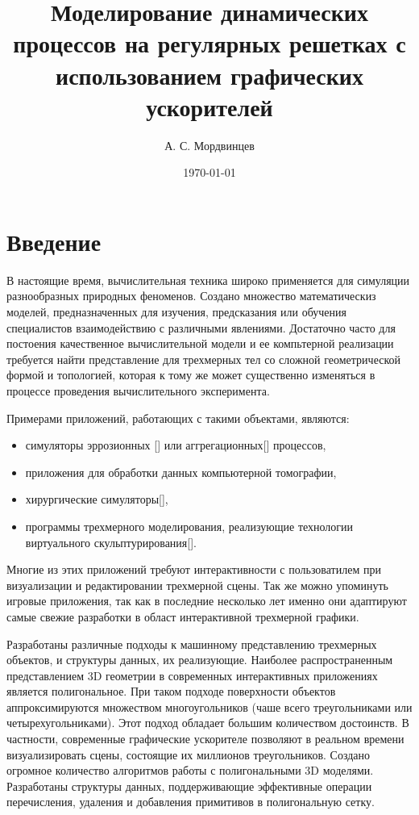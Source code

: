 \documentclass[a4paper,14pt]{extreport}
\begin{document}
\title{Моделирование динамических процессов на регулярных решетках с использованием графических ускорителей}
\author{А. С. Мордвинцев}
\date{\today}


\sloppy  %

\maketitle

\setcounter{page}{3}

\tableofcontents

\chapter*{Введение}

В настоящие время, вычислительная техника широко применяется для симуляции разнообразных природных феноменов. Создано множество математическиз моделей, предназначенных для изучения, предсказания или обучения специалистов взаимодействию с различными явлениями. Достаточно часто для постоения качественное вычислительной модели и ее компьтерной реализации требуется найти представление для трехмерных тел со сложной геометрической формой и топологией, которая к тому же может существенно изменяться в процессе проведения вычислительного эксперимента.

Примерами приложений, работающих с такими объектами, являются:
\begin{itemize}
\item симуляторы эррозионных [] или аггрегационных[] процессов,
\item приложения для обработки данных компьютерной томографии,
\item хирургические симуляторы[],
\item программы трехмерного моделирования, реализующие технологии виртуального скульптурирования[].
\end{itemize}

Многие из этих приложений требуют интерактивности с пользоватилем при визуализации и редактировании трехмерной сцены. Так же можно упоминуть игровые приложения, так как в последние несколько лет именно они адаптируют самые свежие разработки в област интерактивной трехмерной графики.

Разработаны различные подходы к машинному представлению трехмерных объектов, и структуры данных, их реализующие. Наиболее распространенным представлением 3D геометрии в современных интерактивных приложениях является полигональное. При таком подходе поверхности объектов аппроксимируются множеством многоугольников (чаше всего треугольниками или четырехугольниками). Этот подход обладает большим количеством достоинств. В частности, современные графические ускорителе позволяют в реальном времени визуализировать сцены, состоящие их миллионов треугольников. Создано огромное количество алгоритмов работы с полигональными 3D моделями. Разработаны структуры данных, поддерживающие эффективные операции перечисления, удаления и добавления примитивов в полигональную сетку.
\end{document}
